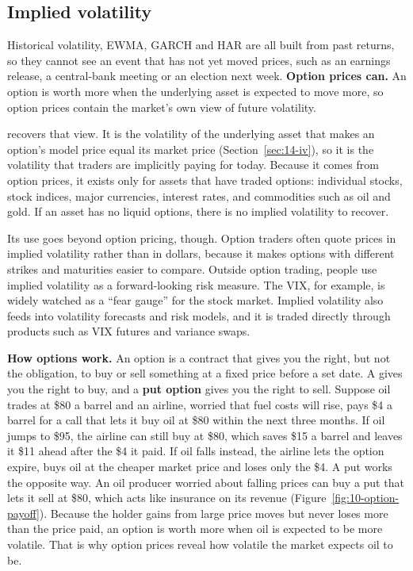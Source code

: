 \subsection{Implied volatility}
\label{sec:10-iv}

Historical volatility, EWMA, GARCH and HAR are all built from past returns, so they cannot see an event that has not yet moved prices, such as an earnings release, a central-bank meeting or an election next week. \textbf{Option prices can.} An option is worth more when the underlying asset is expected to move more, so option prices contain the market's own view of future volatility.


 recovers that view. It is the volatility of the underlying asset that makes an option's model price equal its market price (Section~\ref{sec:14-iv}), so it is the volatility that traders are implicitly paying for today. Because it comes from option prices, it exists only for assets that have traded options: individual stocks, stock indices, major currencies, interest rates, and commodities such as oil and gold. If an asset has no liquid options, there is no implied volatility to recover.

Its use goes beyond option pricing, though. Option traders often quote prices in implied volatility rather than in dollars, because it makes options with different strikes and maturities easier to compare. Outside option trading, people use implied volatility as a forward-looking risk measure. The VIX, for example, is widely watched as a ``fear gauge'' for the stock market. Implied volatility also feeds into volatility forecasts and risk models, and it is traded directly through products such as VIX futures and variance swaps.

\begin{callout}
\textbf{How options work.} An option is a contract that gives you the right, but not the obligation, to buy or sell something at a fixed price before a set date. A  gives you the right to buy, and a \textbf{put option} gives you the right to sell. Suppose oil trades at \$80 a barrel and an airline, worried that fuel costs will rise, pays \$4 a barrel for a call that lets it buy oil at \$80 within the next three months. If oil jumps to \$95, the airline can still buy at \$80, which saves \$15 a barrel and leaves it \$11 ahead after the \$4 it paid. If oil falls instead, the airline lets the option expire, buys oil at the cheaper market price and loses only the \$4. A put works the opposite way. An oil producer worried about falling prices can buy a put that lets it sell at \$80, which acts like insurance on its revenue (Figure~\ref{fig:10-option-payoff}). Because the holder gains from large price moves but never loses more than the price paid, an option is worth more when oil is expected to be more volatile. That is why option prices reveal how volatile the market expects oil to be.
\end{callout}


